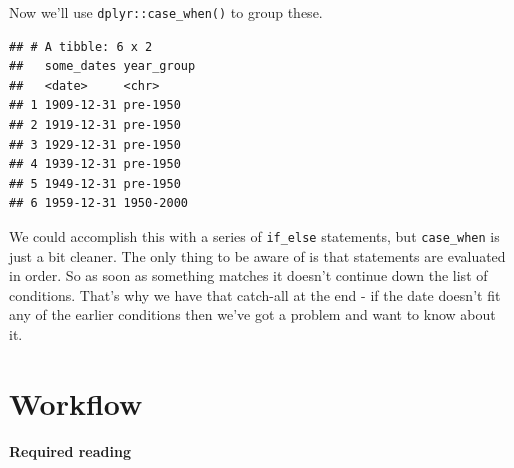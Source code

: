 \documentclass[
]{book}
\newenvironment{Shaded}{\begin{snugshade}}{\end{snugshade}}
\newcommand{\DataTypeTok}[1]{\textcolor[rgb]{0.13,0.29,0.53}{#1}}
\newcommand{\KeywordTok}[1]{\textcolor[rgb]{0.13,0.29,0.53}{\textbf{#1}}}
\newcommand{\NormalTok}[1]{#1}
\newcommand{\OperatorTok}[1]{\textcolor[rgb]{0.81,0.36,0.00}{\textbf{#1}}}
\newcommand{\OtherTok}[1]{\textcolor[rgb]{0.56,0.35,0.01}{#1}}
\newcommand{\StringTok}[1]{\textcolor[rgb]{0.31,0.60,0.02}{#1}}
\begin{document}
Now we'll use \texttt{dplyr::case\_when()} to group these.

\begin{Shaded}
\end{Shaded}

\begin{verbatim}
## # A tibble: 6 x 2
##   some_dates year_group
##   <date>     <chr>     
## 1 1909-12-31 pre-1950  
## 2 1919-12-31 pre-1950  
## 3 1929-12-31 pre-1950  
## 4 1939-12-31 pre-1950  
## 5 1949-12-31 pre-1950  
## 6 1959-12-31 1950-2000
\end{verbatim}

We could accomplish this with a series of \texttt{if\_else} statements, but \texttt{case\_when} is just a bit cleaner. The only thing to be aware of is that statements are evaluated in order. So as soon as something matches it doesn't continue down the list of conditions. That's why we have that catch-all at the end - if the date doesn't fit any of the earlier conditions then we've got a problem and want to know about it.

\hypertarget{workflow}{%
\chapter{Workflow}\label{workflow}}

\textbf{Required reading}
\end{document}
